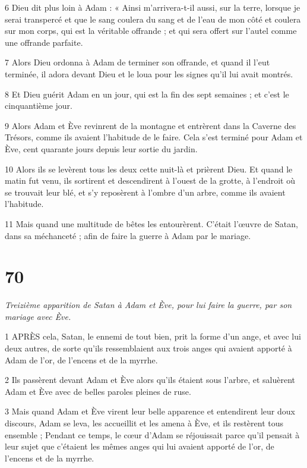 \par 6 Dieu dit plus loin à Adam : « Ainsi m'arrivera-t-il aussi, sur la terre, lorsque je serai transpercé et que le sang coulera du sang et de l'eau de mon côté et coulera sur mon corps, qui est la véritable offrande ; et qui sera offert sur l’autel comme une offrande parfaite.

\par 7 Alors Dieu ordonna à Adam de terminer son offrande, et quand il l'eut terminée, il adora devant Dieu et le loua pour les signes qu'il lui avait montrés.

\par 8 Et Dieu guérit Adam en un jour, qui est la fin des sept semaines ; et c'est le cinquantième jour.

\par 9 Alors Adam et Ève revinrent de la montagne et entrèrent dans la Caverne des Trésors, comme ils avaient l'habitude de le faire. Cela s'est terminé pour Adam et Ève, cent quarante jours depuis leur sortie du jardin.

\par 10 Alors ils se levèrent tous les deux cette nuit-là et prièrent Dieu. Et quand le matin fut venu, ils sortirent et descendirent à l'ouest de la grotte, à l'endroit où se trouvait leur blé, et s'y reposèrent à l'ombre d'un arbre, comme ils avaient l'habitude.

\par 11 Mais quand une multitude de bêtes les entourèrent. C'était l'œuvre de Satan, dans sa méchanceté ; afin de faire la guerre à Adam par le mariage.

\chapter{70}

\par \textit{Treizième apparition de Satan à Adam et Ève, pour lui faire la guerre, par son mariage avec Ève.}

\par 1 APRÈS cela, Satan, le ennemi de tout bien, prit la forme d'un ange, et avec lui deux autres, de sorte qu'ils ressemblaient aux trois anges qui avaient apporté à Adam de l'or, de l'encens et de la myrrhe.

\par 2 Ils passèrent devant Adam et Ève alors qu'ils étaient sous l'arbre, et saluèrent Adam et Ève avec de belles paroles pleines de ruse.

\par 3 Mais quand Adam et Ève virent leur belle apparence et entendirent leur doux discours, Adam se leva, les accueillit et les amena à Ève, et ils restèrent tous ensemble ; Pendant ce temps, le cœur d'Adam se réjouissait parce qu'il pensait à leur sujet que c'étaient les mêmes anges qui lui avaient apporté de l'or, de l'encens et de la myrrhe.

